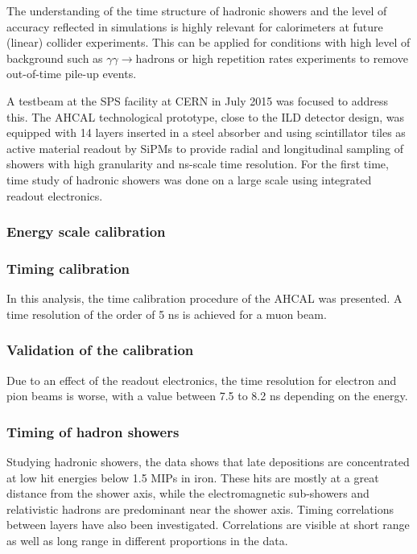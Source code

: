 The understanding of the time structure of hadronic showers and the level of accuracy reflected in \geant simulations is highly relevant for calorimeters at future (linear) collider experiments. This can be applied for conditions with high level of background such as $\gamma\gamma \rightarrow \text{hadrons}$ or high repetition rates experiments to remove out-of-time pile-up events.

A testbeam at the SPS facility at CERN in July 2015 was focused to address this. The AHCAL technological prototype, close to the ILD detector design, was equipped with 14 layers inserted in a steel absorber and using scintillator tiles as active material readout by SiPMs to provide radial and longitudinal sampling of showers with high granularity and ns-scale time resolution. For the first time, time study of hadronic showers was done on a large scale using integrated readout electronics.

\subsubsection{Energy scale calibration}

\subsubsection{Timing calibration}

In this analysis, the time calibration procedure of the AHCAL was presented. A time resolution of the order of 5 ns is achieved for a muon beam.

\subsubsection{Validation of the calibration}

Due to an effect of the readout electronics, the time resolution for electron and pion beams is worse, with a value between 7.5 to 8.2 ns depending on the energy.

\subsubsection{Timing of hadron showers}

Studying hadronic showers, the data shows that late depositions are concentrated at low hit energies below 1.5 MIPs in iron. These hits are mostly at a great distance from the shower axis, while the electromagnetic sub-showers and relativistic hadrons are predominant near the shower axis. Timing correlations between layers have also been investigated. Correlations are visible at short range as well as long range in different proportions in the data.

